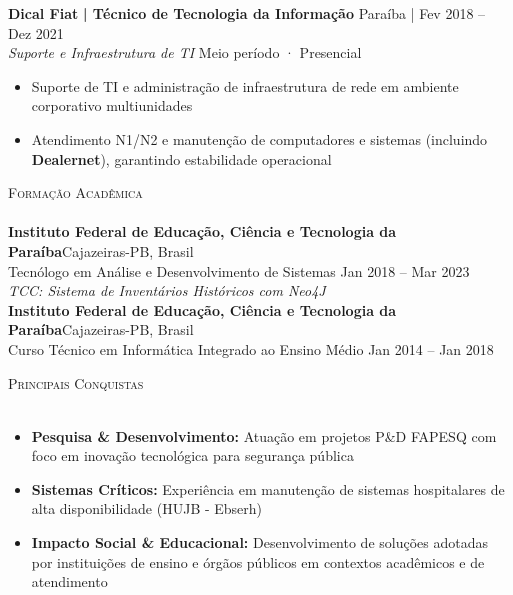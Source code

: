 \documentclass[a4paper]{article}
\newcommand{\lineunder}{
    \vspace*{-8pt} \\
    \hspace*{-18pt} \hrulefill \\
}
\newcommand{\header}[1]{
    {\hspace*{-18pt}\vspace*{6pt} \textsc{#1}}
    \vspace*{-6pt} \lineunder
}
\begin{document}
\textbf{Dical Fiat}\textbf{ | Técnico de Tecnologia da Informação} \hfill Paraíba | Fev 2018 -- Dez 2021\\
\textit{Suporte e Infraestrutura de TI} \hfill Meio período · Presencial\\
\vspace{-3mm}
\begin{itemize} \itemsep -3pt
    \item Suporte de TI e administração de infraestrutura de rede em ambiente corporativo multiunidades
    \item Atendimento N1/N2 e manutenção de computadores e sistemas (incluindo \textbf{Dealernet}), garantindo estabilidade operacional
\end{itemize}

%
%
\header{Formação Acadêmica}
\vspace{2mm}
\textbf{Instituto Federal de Educação, Ciência e Tecnologia da Paraíba}\hfill Cajazeiras-PB, Brasil\\
Tecnólogo em Análise e Desenvolvimento de Sistemas \hfill Jan 2018 -- Mar 2023\\
{\sl TCC: Sistema de Inventários Históricos com Neo4J }\\
\vspace{2mm}
\textbf{Instituto Federal de Educação, Ciência e Tecnologia da Paraíba}\hfill Cajazeiras-PB, Brasil\\
Curso Técnico em Informática Integrado ao Ensino Médio \hfill Jan 2014 -- Jan 2018\\
\vspace{2mm}

%
%
\header{Principais Conquistas}
\vspace{2mm}
\begin{itemize}[leftmargin=*] \itemsep -2pt
    \item \textbf{Pesquisa \& Desenvolvimento:} Atuação em projetos P\&D FAPESQ com foco em inovação tecnológica para segurança pública
    \item \textbf{Sistemas Críticos:} Experiência em manutenção de sistemas hospitalares de alta disponibilidade (HUJB - Ebserh)
    \item \textbf{Impacto Social \& Educacional:} Desenvolvimento de soluções adotadas por instituições de ensino e órgãos públicos em contextos acadêmicos e de atendimento
\end{itemize}
\vspace{2mm}
\end{document}
